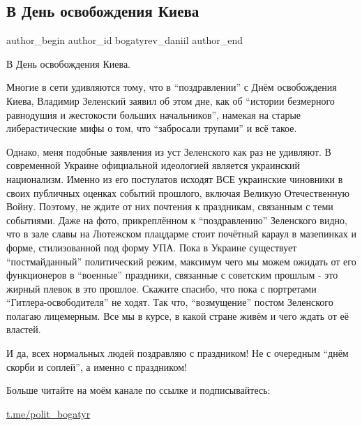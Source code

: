  
 
 
 
 
 
\subsection{В День освобождения Киева}
\label{sec:06_11_2021.fb.bogatyrev_daniil.1.den_osvobozhdenia_kieva}
 
\ifcmt
 author_begin
   author_id bogatyrev_daniil
 author_end
\fi

В День освобождения Киева.

Многие в сети удивляются тому, что в \enquote{поздравлении} с Днём освобождения Киева,
Владимир Зеленский заявил об этом дне, как об \enquote{истории безмерного равнодушия и
жестокости больших начальников}, намекая на старые либерастические мифы о том,
что \enquote{забросали трупами} и всё такое. 

Однако, меня подобные заявления из уст Зеленского как раз не удивляют. В
современной Украине официальной идеологией является украинский национализм.
Именно из его постулатов исходят ВСЕ украинские чиновники в своих публичных
оценках событий прошлого, включая Великую Отечественную Войну. Поэтому, не
ждите от них почтения к праздникам, связанным с теми событиями. Даже на фото,
прикреплённом к \enquote{поздравлению} Зеленского видно, что в зале славы на Лютежском
плацдарме стоит почётный караул в мазепинках и форме, стилизованной под форму
УПА. Пока в Украине существует \enquote{постмайданный} политический режим, максимум
чего мы можем ожидать от его функционеров в \enquote{военные} праздники, связанные с
советским прошлым - это жирный плевок в это прошлое. Скажите спасибо, что пока
с портретами \enquote{Гитлера-освободителя} не ходят. Так что, \enquote{возмущение} постом
Зеленского полагаю лицемерным. Все мы в курсе, в какой стране живём и чего
ждать от её властей. 

И да, всех нормальных людей поздравляю с праздником! Не с очередным \enquote{днём
скорби и соплей}, а именно с праздником!

Больше читайте на моём канале по ссылке и подписывайтесь: 

\url{t.me/polit_bogatyr}

